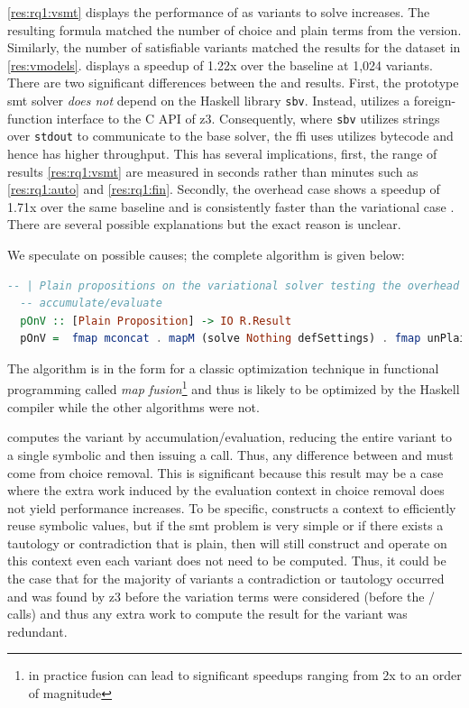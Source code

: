 \autoref{res:rq1:vsmt} displays the performance of \vsmt{} as variants to solve
increases. The resulting \evpl{} formula matched the number of choice and plain
terms from the \vsat{} version. Similarly, the number of satisfiable variants
matched the results for the \fin{} dataset in \autoref{res:vmodels}. \vsmt{}
displays a speedup of 1.22x over the baseline \vTop{} at 1,024 variants. There
are two significant differences between the \vsmt{} and \vsat{} results. First,
the prototype \ac{smt} solver \emph{does not} depend on the Haskell library
\texttt{sbv}. Instead, \vsmt{} utilizes a foreign-function interface to the C
API of z3. Consequently, where \texttt{sbv} utilizes strings over
\texttt{stdout} to communicate to the base solver, the ffi \vsmt{} uses utilizes
bytecode and hence has higher throughput. This has several implications, first,
the range of results \autoref{res:rq1:vsmt} are measured in seconds rather than
minutes such as \autoref{res:rq1:auto} and \autoref{res:rq1:fin}. Secondly, the
overhead case \pTov{} shows a speedup of 1.71x over the same baseline and is
consistently faster than the variational case \vTov{}. There are several
possible explanations but the exact reason is unclear.

We speculate on possible causes; the complete \pTov{} algorithm is given below:
%
\begin{lstlisting}[columns=flexible,keepspaces=true,language=Haskell]
  -- | Plain propositions on the variational solver testing the overhead of
  -- accumulate/evaluate
  pOnV :: [Plain Proposition] -> IO R.Result
  pOnV =  fmap mconcat . mapM (solve Nothing defSettings) . fmap unPlain
\end{lstlisting}
%
The algorithm is in the form for a classic optimization technique in functional
programming called \emph{map fusion}\footnote{in practice fusion can lead to
significant speedups ranging from 2x to an order of magnitude} and thus is likely to be optimized
by the Haskell compiler while the other algorithms were not.

\pTov{} computes the variant by accumulation/evaluation, reducing the entire
variant to a single symbolic and then issuing a  call. Thus, any
difference between \vTov{} and \pTov{} must come from choice removal.
%
This is significant because this result may be a case where the extra work
induced by the evaluation context in choice removal does not yield performance
increases. To be specific, \vTov{} constructs a context to efficiently reuse
symbolic values, but if the \ac{smt} problem is very simple or if there exists a
tautology or contradiction that is plain, then \vTov{} will still construct and
operate on this context even each variant does not need to be computed. Thus, it
could be the case that for the majority of variants a contradiction or tautology
occurred and was found by z3 before the variation terms were considered (before
the / calls) and thus any extra work to compute the result for
the variant was redundant.

